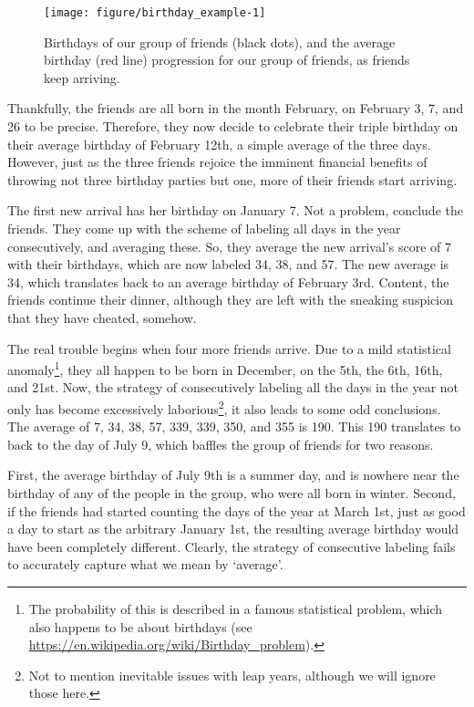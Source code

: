 \documentclass[12pt, a4paper]{book}\usepackage[]{graphicx}\usepackage{xcolor}
\makeatletter
\def\maxwidth{ %
  \ifdim\Gin@nat@width>\linewidth
    \linewidth
  \else
    \Gin@nat@width
  \fi
}
\newenvironment{knitrout}{}{} %
\makeatother
\begin{document}
\begin{figure}
\begin{knitrout}
\color{fgcolor}
\texttt{[image: figure/birthday\_example-1]} 

\end{knitrout}
\caption{Birthdays of our group of friends (black dots), and the average birthday (red line) progression for our group of friends, as friends keep arriving.}
\label{birthday_example}
\end{figure}


Thankfully, the friends are all born in the month February, on February 3, 7, and 26 to be precise. Therefore, they now decide to celebrate their triple birthday on their average birthday of February 12th, a simple average of the three days. However, just as the three friends rejoice the imminent financial benefits of throwing not three birthday parties but one, more of their friends start arriving.

The first new arrival has her birthday on January 7. Not a problem, conclude the friends. They come up with the scheme of labeling all days in the year consecutively, and averaging these. So, they average the new arrival's score of 7 with their birthdays, which are now labeled 34, 38, and 57. The new average is 34, which translates back to an average birthday of February 3rd. Content, the friends continue their dinner, although they are left with the sneaking suspicion that they have cheated, somehow.




The real trouble begins when four more friends arrive. Due to a mild statistical anomaly\footnote{The probability of this is described in a famous statistical problem, which also happens to be about birthdays (see \url{https://en.wikipedia.org/wiki/Birthday_problem}).}, they all happen to be born in December, on the 5th, the 6th,  16th, and 21st. Now, the strategy of consecutively labeling all the days in the year not only has become excessively laborious\footnote{Not to mention inevitable issues with leap years, although we will ignore those here.}, it also leads to some odd conclusions. The average of 7, 34, 38, 57, 339, 339, 350, and 355 is 190. This 190 translates to back to the day of July 9, which baffles the group of friends for two reasons.

First, the average birthday of July 9th is a summer day, and is nowhere near the birthday of any of the people in the group, who were all born in winter. Second, if the friends had started counting the days of the year at March 1st, just as good a day to start as the arbitrary January 1st, the resulting average birthday would have been completely different. Clearly, the strategy of consecutive labeling fails to accurately capture what we mean by `average'.
\end{document}
